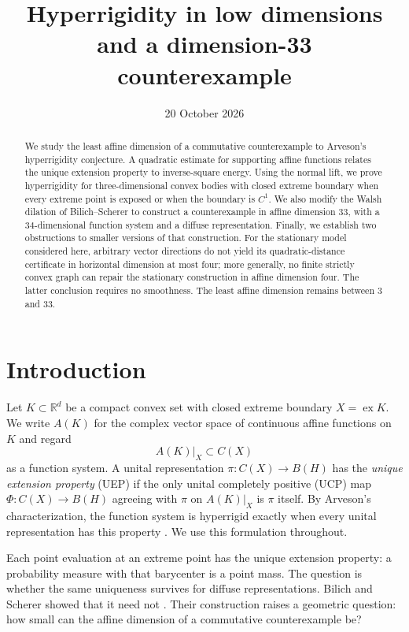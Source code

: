 \documentclass[11pt,letterpaper]{amsart}
\title[Hyperrigidity in low dimensions]{Hyperrigidity in low dimensions\\and a dimension-33 counterexample}
\date{20 October 2026}
\theoremstyle{definition}
\theoremstyle{remark}
\numberwithin{equation}{section}
\DeclareMathOperator{\ex}{ex}
\newcommand{\R}{\mathbb R}
\begin{document}
\begin{abstract}
We study the least affine dimension of a commutative counterexample to
Arveson's hyperrigidity conjecture. A quadratic estimate for supporting
affine functions relates the unique extension property to inverse-square
energy. Using the normal lift, we prove hyperrigidity for three-dimensional
convex bodies with closed extreme boundary when every extreme point is
exposed or when the boundary is $C^1$. We also modify the Walsh dilation
of Bilich--Scherer to construct a counterexample in affine dimension $33$,
with a $34$-dimensional function system and a diffuse representation.
Finally, we establish two obstructions to smaller versions of that
construction. For the stationary model considered here, arbitrary vector
directions do not yield its
quadratic-distance certificate in horizontal dimension at most four;
more generally, no finite strictly convex graph can repair the stationary
construction in affine dimension four. The latter conclusion requires
no smoothness. The least affine dimension remains between
$3$ and $33$.
\end{abstract}
\maketitle

\section{Introduction}
\label{sec:introduction}

Let $K\subset\R^d$ be a compact convex set with closed extreme boundary
$X=\ex K$. We write $A(K)$ for the complex vector space of continuous
affine functions on $K$ and regard
\[
                         A(K)|_X\subset C(X)
\]
as a function system. A unital representation $\pi:C(X)\to B(H)$ has
the \emph{unique extension property} (UEP) if the only unital completely
positive (UCP) map $\Phi:C(X)\to B(H)$ agreeing with $\pi$ on $A(K)|_X$ is
$\pi$ itself. By Arveson's characterization, the function system is
hyperrigid exactly when every unital representation has this property
\cite{Arv}. We use this formulation throughout.

Each point evaluation at an extreme point has the unique extension
property: a probability measure with that barycenter is a point mass.
The question is whether the same uniqueness survives for diffuse
representations. Bilich and Scherer showed that it need not
\cite{BS}. Their construction raises a geometric question: how small
can the affine dimension of a commutative counterexample be?
\end{document}
